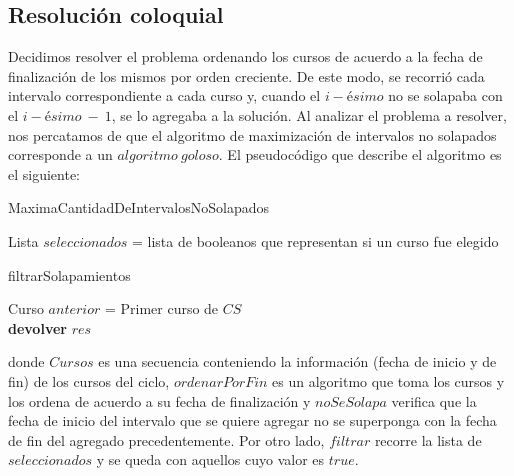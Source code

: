 \subsection{Resolución coloquial}

Decidimos resolver el problema ordenando los cursos de acuerdo a la fecha de finalización de los mismos por orden creciente. De este modo, se recorrió cada intervalo correspondiente a cada curso y, cuando el $i-ésimo$ no se solapaba con el $i-ésimo\ -\ 1$, se lo agregaba a la solución.\newline
Al analizar el problema a resolver, nos percatamos de que el algoritmo de maximización de intervalos no solapados corresponde a un $algoritmo\ goloso$. El pseudocódigo que describe el algoritmo es el siguiente:\newline

\begin{algorithm}[H]
    \SetAlgoLined
    \caption{MaximaCantidadDeIntervalosNoSolapados}
    Lista $seleccionados$ = lista de booleanos que representan si un curso fue elegido
\end{algorithm}

\begin{algorithm}[H]
    \SetAlgoLined
    \caption{filtrarSolapamientos}
    Curso $anterior$ = Primer curso de $CS$\\
    \textbf{devolver} $res$\\   
\end{algorithm}


donde $Cursos$ es una secuencia conteniendo la información (fecha de inicio y de fin) de los cursos del ciclo, $ordenarPorFin$ es un algoritmo que toma los cursos y los ordena de acuerdo a su fecha de finalización y $noSeSolapa$ verifica que la fecha de inicio del intervalo que se quiere agregar no se superponga con la fecha de fin del agregado precedentemente. Por otro lado, $filtrar$ recorre la lista de $seleccionados$ y se queda con aquellos cuyo valor es $true$.

